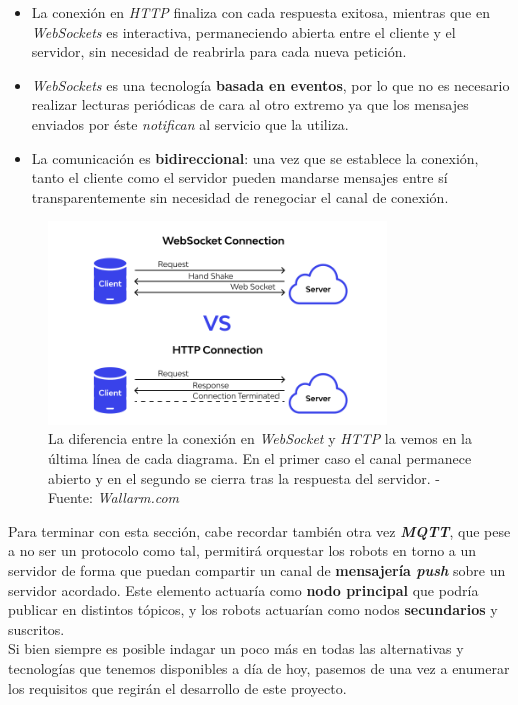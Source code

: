 \begin{itemize}
	\item La conexión en \textit{HTTP} finaliza con cada respuesta exitosa, mientras que en \textit{WebSockets} es interactiva, permaneciendo abierta entre el cliente y el servidor, sin necesidad de reabrirla para cada nueva petición.
	\item \textit{WebSockets} es una tecnología \textbf{basada en eventos}, por lo que no es necesario realizar lecturas periódicas de cara al otro extremo ya que los mensajes enviados por éste \textit{notifican} al servicio que la utiliza.
	\item La comunicación es \textbf{bidireccional}: una vez que se establece la conexión, tanto el cliente como el servidor pueden mandarse mensajes entre sí transparentemente sin necesidad de renegociar el canal de conexión.
\end{itemize}

\begin{figure}[h]
	\centering
	\includegraphics[width=0.8\textwidth]{imagenes/ws_vs_http.png}
	\caption{La diferencia entre la conexión en \textit{WebSocket} y \textit{HTTP} la vemos en la última línea de cada diagrama. En el primer caso el canal permanece abierto y en el segundo se cierra tras la respuesta del servidor. - Fuente: \textit{Wallarm.com} \cite{ws_connection}}
	\label{ws-vs-http}
\end{figure}

Para terminar con esta sección, cabe recordar también otra vez \textbf{\textit{MQTT}}, que pese a no ser un protocolo como tal, permitirá orquestar los robots en torno a un servidor de forma que puedan compartir un canal de \textbf{mensajería \textit{push}} sobre un servidor acordado. Este elemento actuaría como \textbf{nodo principal} que podría publicar en distintos tópicos, y los robots actuarían como nodos \textbf{secundarios} y suscritos.\\

Si bien siempre es posible indagar un poco más en todas las alternativas y tecnologías que tenemos disponibles a día de hoy, pasemos de una vez a enumerar los requisitos que regirán el desarrollo de este proyecto.\\















